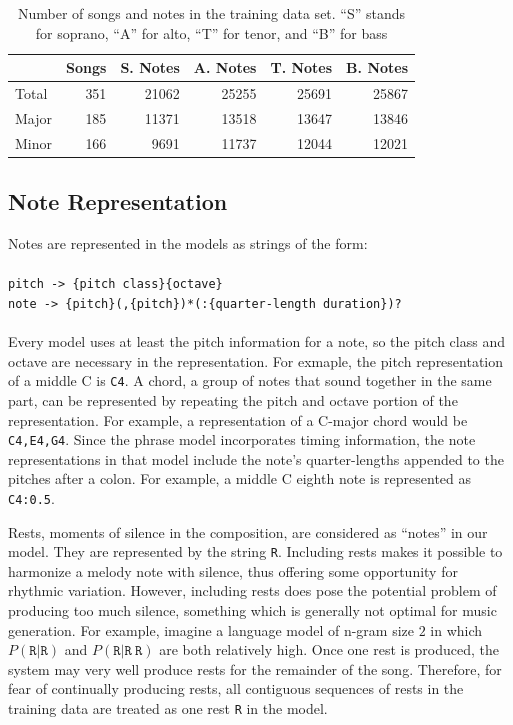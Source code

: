 \documentclass{sig-alternate}
\begin{document}
\begin{table}[h]
  \begin{center}
      \begin{tabular}{| l | r | r | r | r | r |}
      \hline
       \  & Songs & S. Notes & A. Notes & T. Notes & B. Notes \\ \hline
       Total &  351 & 21062 & 25255 & 25691 & 25867 \\ 
       Major &  185 & 11371 & 13518 & 13647 & 13846 \\ 
       Minor & 166 & 9691 & 11737 & 12044 & 12021  \\ \hline
      \end{tabular}
  \end{center}
  \caption{Number of songs and notes in the training data set. ``S'' stands for soprano, ``A'' for alto, ``T'' for tenor, and ``B'' for bass}
\end{table}

\subsection{Note Representation}
Notes are represented in the models as strings of the form:\\
\\
\texttt{pitch -> \{pitch class\}\{octave\}}\\
\texttt{note -> \{pitch\}(,\{pitch\})*(:\{quarter-length duration\})?}\\
\\
Every model uses at least the pitch information for a note, so the pitch class and octave are necessary in the representation. For exmaple, the pitch representation of a middle C is \texttt{C4}. A chord, a group of notes that sound together in the same part, can be represented by repeating the pitch and octave portion of the representation. For example, a representation of a C-major chord would be \texttt{C4,E4,G4}. Since the phrase model incorporates timing information, the note representations in that model include the note's quarter-lengths appended to the pitches after a colon. For example, a middle C eighth note is represented as \texttt{C4:0.5}.

Rests, moments of silence in the composition, are considered as ``notes'' in our model. They are represented by the string \texttt{R}. Including rests makes it possible to harmonize a melody note with silence, thus offering some opportunity for rhythmic variation. However, including rests does pose the potential problem of producing too much silence, something which is generally not optimal for music generation. For example, imagine a language model of n-gram size $2$ in which $P(\texttt{R} | \texttt{R})$ and $P (\texttt{R} | \texttt{R}\ \texttt{R})$ are both relatively high. Once one rest is produced, the system may very well produce rests for the remainder of the song. Therefore, for fear of continually producing rests, all contiguous sequences of rests in the training data are treated as one rest \texttt{R} in the model.
\end{document}
